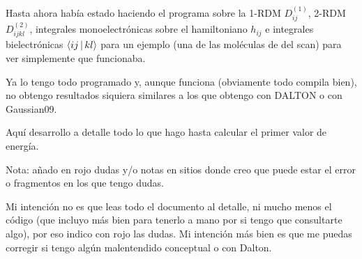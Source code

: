
Hasta ahora había estado haciendo el programa sobre la 1-RDM $D^{(1)}_{ij}$,
2-RDM $D^{(2)}_{ijkl}$, integrales monoelectrónicas sobre el hamiltoniano
$h_{ij}$ e integrales bielectrónicas $ \Braket{ij | kl}$ para un ejemplo
(una de las moléculas de  del scan) para ver simplemente que funcionaba.

Ya lo tengo todo programado y, aunque funciona (obviamente todo compila bien),
no obtengo resultados siquiera similares a los que obtengo con DALTON o con
Gaussian09.

Aquí desarrollo a detalle todo lo que hago hasta calcular el primer valor
de energía.

Nota: añado en rojo dudas y/o notas en sitios donde creo que puede estar el error o 
fragmentos en los que tengo dudas.

Mi intención no es que leas todo el documento al detalle, ni mucho menos el 
código (que incluyo más bien para tenerlo a mano por si tengo que consultarte
algo), por eso indico con rojo las dudas.
Mi intención más bien es que me puedas corregir si tengo algún malentendido
conceptual o con Dalton.
